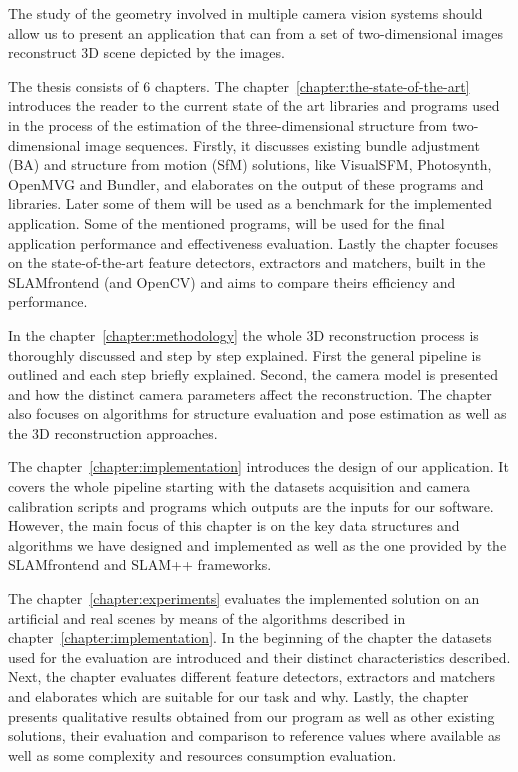 The study of the geometry involved in multiple camera vision systems should allow us to present an application that can from a set of two-dimensional images reconstruct 3D scene depicted by the images.

The thesis consists of 6 chapters. The chapter~\ref{chapter:the-state-of-the-art} introduces the reader to the current state of the art libraries and programs used in the process of the estimation of the three-dimensional structure from two-dimensional image sequences. Firstly, it discusses existing bundle adjustment (BA) and structure from motion (SfM) solutions, like VisualSFM, Photosynth, OpenMVG and Bundler, and elaborates on the output of these programs and libraries. Later some of them will be used as a benchmark for the implemented application. Some of the mentioned programs, will be used for the final application performance and effectiveness evaluation. Lastly the chapter focuses on the state-of-the-art feature detectors, extractors and matchers, built in the SLAM\textunderscore frontend (and OpenCV) and aims to compare theirs efficiency and performance.

In the chapter~\ref{chapter:methodology} the whole 3D reconstruction process is thoroughly discussed and step by step explained. First the general pipeline is outlined and each step briefly explained.  Second, the camera model is presented and how the distinct camera parameters affect the reconstruction. The chapter also focuses on algorithms for structure evaluation and pose estimation as well as the 3D reconstruction approaches.

The chapter~\ref{chapter:implementation} introduces the design of our application. It covers the whole pipeline starting with the datasets acquisition and camera calibration scripts and programs which outputs are the inputs for our software. However, the main focus of this chapter is on the key data structures and algorithms we have designed and implemented as well as the one provided by the SLAM\textunderscore frontend and SLAM++ frameworks.

The chapter~\ref{chapter:experiments} evaluates the implemented solution on an artificial and real scenes by means of the algorithms described in chapter~\ref{chapter:implementation}. In the beginning of the chapter the datasets used for the evaluation are introduced and their distinct characteristics described. Next, the chapter evaluates different feature detectors, extractors and matchers and elaborates which are suitable for our task and why. Lastly, the chapter presents qualitative results obtained from our program as well as other existing solutions, their evaluation and comparison to reference values where available as well as some complexity and resources consumption evaluation.

